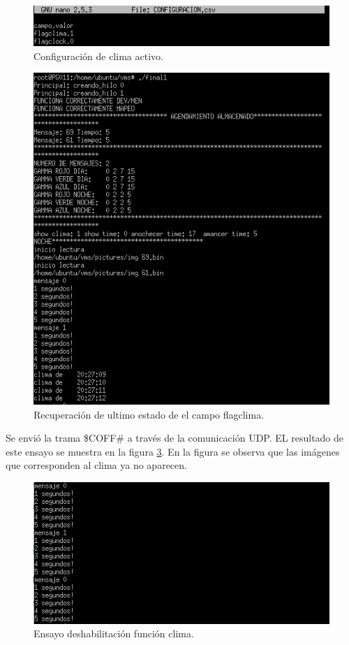\begin{figure}[htpb]
	\centering
	\includegraphics[scale=0.8]{Figures/pruebaclima2.png} 
	\caption{Configuración de clima activo.}
	\label{fig: ensayo clima 2}
\end{figure}

\begin{figure}[htpb]
	\centering
	\includegraphics[scale=0.8]{Figures/pruebaclima3.png} 
	\caption{Recuperación de ultimo estado de el campo flagclima.}
	\label{fig: ensayo clima 3}
\end{figure}

Se envió la trama \$COFF\# a través de la comunicación UDP.  EL resultado de este ensayo se muestra en la figura \ref{fig: pruebas clima 2}. En la figura se observa que las imágenes que corresponden al clima ya no aparecen.

\begin{figure}[htpb]
	\centering
	\includegraphics[scale=0.8]{Figures/prubasclimaoff.png} 
	\caption{Ensayo deshabilitación función clima.}
	\label{fig: pruebas clima 2}
\end{figure}

